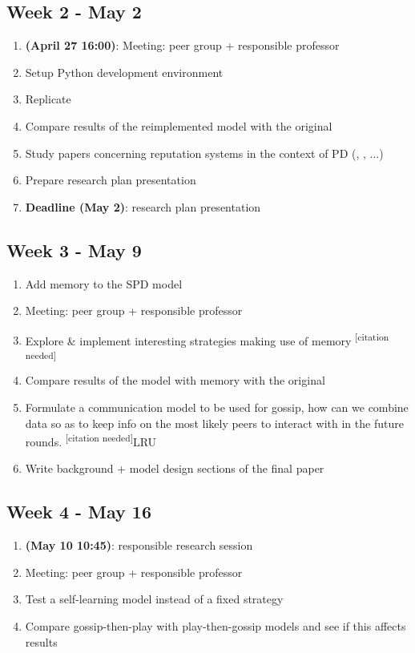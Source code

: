 \documentclass[english]{article}
\newcommand{\citationneeded}{\textsuperscript{\color{blue} [citation needed]}}
\begin{document}
\subsection*{Week 2 - May 2}
\begin{enumerate}
\item \textbf{(April 27 16:00)}: Meeting: peer group + responsible professor
\item Setup Python development environment
\item Replicate \citet{smaldino}
\item Compare results of the reimplemented model with the original
\item Study papers concerning reputation systems in the context of PD (\citet{simple-reputation}, \citet{public-private-monitoring}, ...)
\item Prepare research plan presentation
\item \textbf{Deadline (May 2)}: research plan presentation
\end{enumerate}

\subsection*{Week 3 - May 9}
\begin{enumerate}
\item Add memory to the SPD model
\item Meeting: peer group + responsible professor
\item Explore \& implement interesting strategies making use of memory \citationneeded
\item Compare results of the model with memory with the original
\item Formulate a communication model to be used for gossip, how can we combine data so as to keep info on the most likely peers to interact with in the future rounds. \citationneeded{LRU}
\item Write background + model design sections of the final paper
\end{enumerate}

\subsection*{Week 4 - May 16}
\begin{enumerate}
\item \textbf{(May 10 10:45)}: responsible research session
\item Meeting: peer group + responsible professor
\item Test a self-learning model instead of a fixed strategy
\item Compare gossip-then-play with play-then-gossip models and see if this affects results
\end{enumerate}
\end{document}
